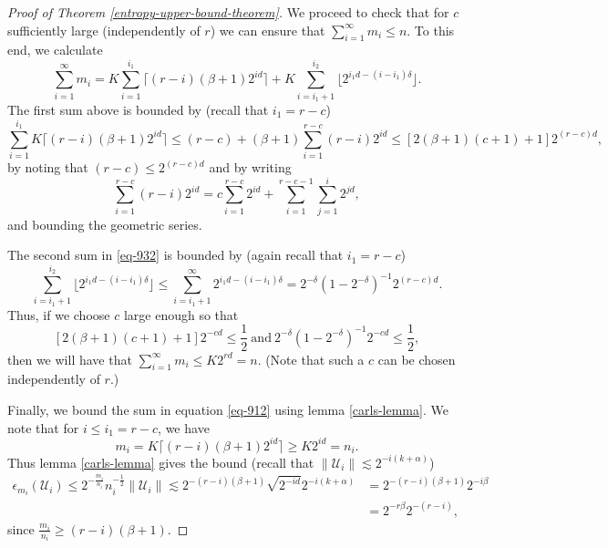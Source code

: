 \begin{proof}[Proof of Theorem \ref{entropy-upper-bound-theorem}]
We proceed to check that for $c$ sufficiently large (independently of $r$) we can ensure that $\sum_{i=1}^\infty m_i \leq n$. To this end, we calculate
\begin{equation}\label{eq-932}
 \sum_{i=1}^\infty m_i = K\sum_{i=1}^{i_1} \lceil(r-i)(\beta + 1)2^{id}\rceil + K\sum_{i=i_1+1}^{i_2} \lfloor2^{i_1d - (i - i_1)\delta}\rfloor.
\end{equation}
The first sum above is bounded by (recall that $i_1 = r-c$)
\begin{equation}
 \sum_{i=1}^{i_1} K\lceil(r-i)(\beta + 1)2^{id}\rceil \leq (r-c) + (\beta + 1)\sum_{i=1}^{r-c} (r-i)2^{id} \leq [2(\beta + 1)(c+1) + 1]2^{(r-c)d},
\end{equation}
by noting that $(r-c) \leq 2^{(r-c)d}$ and by writing 
$$\sum_{i=1}^{r-c} (r-i)2^{id} = c\sum_{i=1}^{r-c} 2^{id} + \sum_{i=1}^{r-c-1}\sum_{j=1}^{i}2^{jd},$$ 
and bounding the geometric series.

The second sum in \eqref{eq-932} is bounded by (again recall that $i_1 = r-c$)
\begin{equation}
 \sum_{i=i_1+1}^{i_2} \lfloor2^{i_1d - (i - i_1)\delta}\rfloor \leq \sum_{i=i_1+1}^{\infty} 2^{i_1d - (i - i_1)\delta} = 2^{-\delta}(1 - 2^{-\delta})^{-1}2^{(r-c)d}.
\end{equation}
Thus, if we choose $c$ large enough so that
$$
 [2(\beta + 1)(c+1) + 1]2^{-cd} \leq \frac{1}{2}~\text{and}~2^{-\delta}(1 - 2^{-\delta})^{-1}2^{-cd} \leq \frac{1}{2},
$$
then we will have that $\sum_{i=1}^\infty m_i \leq K2^{rd} = n$. (Note that such a $c$ can be chosen independently of $r$.)

Finally, we bound the sum in equation \eqref{eq-912} using lemma \ref{carls-lemma}. We note that for $i \leq i_1 = r-c$, we have 
$$m_i = K\lceil(r-i)(\beta + 1)2^{id}\rceil \geq K2^{id} = n_i.$$ 
Thus lemma \ref{carls-lemma} gives the bound (recall that $\|\mathcal{U}_i\|\lesssim 2^{-i(k+\alpha)}$)
\begin{equation}
\begin{split}
 \epsilon_{m_i}(\mathcal{U}_i) \leq 2^{-\frac{m_i}{n_i}}n_i^{-\frac{1}{2}}\|\mathcal{U}_i\| \lesssim 2^{-(r-i)(\beta + 1)}\sqrt{2^{-id}}2^{-i(k+\alpha)} &= 2^{-(r-i)(\beta + 1)}2^{-i\beta} \\
 & = 2^{-r\beta}2^{-(r-i)},
 \end{split}
\end{equation}
since $\frac{m_i}{n_i} \geq (r-i)(\beta + 1)$.


\end{proof}
